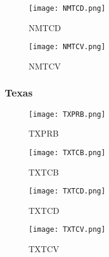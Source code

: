\documentclass{mcmthesis}
\newcommand{\rmnum}[1]{\romannumeral #1}
\begin{document}
\begin{figure}[H]
\begin{minipage}[htb]{0.5\textwidth}
\centering
\texttt{[image: NMTCD.png]}
\caption{NMTCD} \label{fig:NMTCD}
\end{minipage}
\begin{minipage}[htb]{0.5\textwidth}
\centering
\texttt{[image: NMTCV.png]}
\caption{NMTCV} \label{fig:NMTCV}
\end{minipage}
\end{figure}

\subsubsection{Texas}
\begin{figure}[H]
\begin{minipage}[htb]{0.5\textwidth}
\centering
\texttt{[image: TXPRB.png]}
\caption{TXPRB} \label{fig:TXPRB}
\end{minipage}
\begin{minipage}[htb]{0.5\textwidth}
\centering
\texttt{[image: TXTCB.png]}
\caption{TXTCB} \label{fig:TXTCB}
\end{minipage}
\end{figure}

\begin{figure}[H]
\begin{minipage}[htb]{0.5\textwidth}
\centering
\texttt{[image: TXTCD.png]}
\caption{TXTCD} \label{fig:TXTCD}
\end{minipage}
\begin{minipage}[htb]{0.5\textwidth}
\centering
\texttt{[image: TXTCV.png]}
\caption{TXTCV} \label{fig:TXTCV}
\end{minipage}
\end{figure}






\newpage
\setcounter{page}{2}
\pagestyle{fancy} 
\rhead{\small\sffamily  \rmnum{\thepage}}



\end{document}
